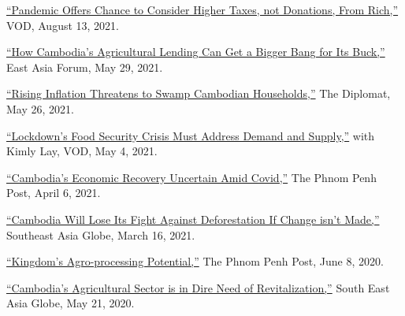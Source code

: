\documentclass[10pt,a4paper]{article}
\begin{document}
	\href{https://vodenglish.news/opinion-pandemic-offers-chance-to-consider-higher-taxes-not-donations-from-rich/}{``Pandemic Offers Chance to Consider Higher Taxes, not Donations, From Rich,''} VOD, August 13, 2021.\\ \vspace{-.5em}

	\href{https://www.eastasiaforum.org/2021/05/29/how-cambodias-agricultural-lending-can-get-a-bigger-bang-for-its-buck/}{``How Cambodia's Agricultural Lending Can Get a Bigger Bang for Its Buck,''} East Asia Forum, May 29, 2021.\\ \vspace{-.5em}

	\href{https://thediplomat.com/2021/05/rising-inflation-threatens-to-swamp-cambodian-households/}{``Rising Inflation Threatens to Swamp Cambodian Households,''} The Diplomat, May 26, 2021.\\ \vspace{-.5em}

	\href{https://vodenglish.news/opinion-lockdowns-food-security-crisis-must-address-demand-and-supply/}{``Lockdown's Food Security Crisis Must Address Demand and Supply,''} with Kimly Lay, VOD, May 4, 2021.\\ \vspace{-.5em}

	\href{https://www.phnompenhpost.com/opinion/cambodias-economic-recovery-uncertain-amid-covid}{``Cambodia's Economic Recovery Uncertain Amid Covid,''} The Phnom Penh Post, April 6, 2021.\\ \vspace{-.5em}

	\href{https://southeastasiaglobe.com/cambodia-deforestation-fight/}{``Cambodia Will Lose Its Fight Against Deforestation If Change isn't Made,''} Southeast Asia Globe, March 16, 2021.\\ \vspace{-.5em}

	\href{https://www.phnompenhpost.com/opinion/kingdoms-agro-processing-potential}{``Kingdom’s Agro-processing Potential,''} The Phnom Penh Post, June 8, 2020.\\  \vspace{-.5em}

	 \href{https://southeastasiaglobe.com/cambodias-agricultural-sector-is-one-in-dire-need-of-revitalising}{``Cambodia’s Agricultural Sector is in Dire Need of Revitalization,''} South East Asia Globe, May 21, 2020.

\end{document}
